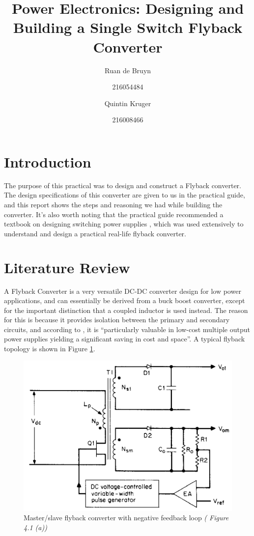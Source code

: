 \documentclass[a4paper, 12pt]{article}
\title{Power Electronics: Designing and Building a Single Switch Flyback Converter}
\author{Ruan de Bruyn \and 216054484 \and Quintin Kruger \and 216008466}
\begin{document}
\maketitle
\newpage
{}
\tableofcontents
\listoffigures
\newpage
{}

\section{Introduction}

The purpose of this practical was to design and construct a Flyback converter.
The design specifications of this converter are given to us in the practical
guide, and this report shows the steps and reasoning we had while building the
converter. It's also worth noting that the practical guide recommended a
textbook on designing switching power supplies \cite{pressman}, which was used
extensively to understand and design a practical real-life flyback converter.


\section{Literature Review}

A Flyback Converter is a very versatile DC-DC converter design for low power
applications, and can essentially be derived from a buck boost converter,
except for the important distinction that a coupled inductor is used instead.
The reason for this is because it provides isolation between the primary and
secondary circuits, and according to \cite{pressman}, it is ``particularly
valuable in low-cost multiple output power supplies yielding a significant
saving in cost and space''. A typical flyback topology is shown in Figure
\ref{fig:pressman_circuit}.

\begin{figure}[H]
  \centering
  \includegraphics[width=.6\textwidth]{./images/pressman_circuit.png}
  \caption{Master/slave flyback converter with negative feedback loop \textit{(\cite{pressman} Figure 4.1 (a))}}
  \label{fig:pressman_circuit}
\end{figure}
\end{document}
